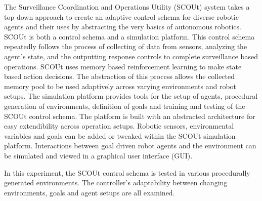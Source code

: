 The Surveillance Coordination and Operations Utility (SCOUt) system takes a top down approach to create an adaptive control schema for diverse robotic agents and their uses by abstracting the very basics of autonomous robotics.
SCOUt is both a control schema and a simulation platform.
This control schema repeatedly follows the process of collecting of data from sensors, analyzing the agent's state, and the outputting response controls to complete surveillance based operations.
SCOUt uses memory based reinforcement learning to make state based action decisions.
The abstraction of this process allows the collected memory pool to be used adaptively across varying environments and robot setups.
The simulation platform provides tools for the setup of agents, procedural generation of environments, definition of goals and training and testing of the SCOUt control schema.
The platform is built with an abstracted architecture for easy extendibility across operation setups.
Robotic sensors, environmental variables and goals can be added or tweaked within the SCOUt simulation platform.
Interactions between goal driven robot agents and the environment can be simulated and viewed in a graphical user interface (GUI).

In this experiment, the SCOUt control schema is tested in various procedurally generated environments.
The controller's adaptability between changing environments, goals and agent setups are all examined.


